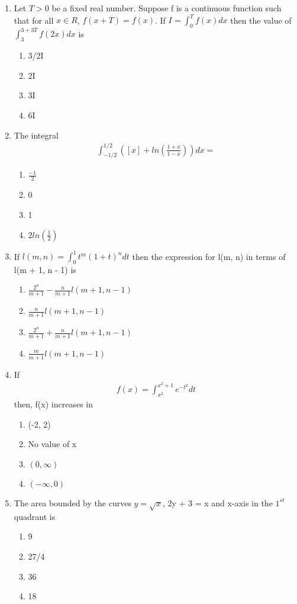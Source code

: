\begin{enumerate}[label=\arabic*.,ref=\thesubsection.\theenumi]
\item Let  $T > 0$ be a fixed real number. Suppose f is a continuous function such that for all $x \in R$, $f(x + T) = f(x)$. If $I = \int_{0}^{T}f(x)dx$ then the value of $\int_{3}^{3 + 3T}f(2x)dx$ is
\begin{enumerate}
\item 3/2I
\item 2I
\item 3I
\item 6I
\end{enumerate}

\item The integral
\begin{align*}
\int_{-1/2}^{1/2}([x] + ln(\frac{1 + x}{1 - x}))dx = 
\end{align*}
\begin{enumerate}
\item $\frac{-1}{2}$
\item 0
\item 1
\item $2ln(\frac{1}{2})$
\end{enumerate}

\item If 
$l(m, n) = \int_{0}^{1}t^{m}(1 + t)^{n}dt$
then the expression for l(m, n) in terms of l(m + 1, n - 1) is
\begin{enumerate}
\item $\frac{2^n}{m + 1} - \frac{n}{m + 1}l(m + 1, n -1)$
\item $\frac{n}{m + 1}l(m + 1, n -1)$
\item $\frac{2^n}{m + 1} + \frac{n}{m + 1}l(m + 1, n -1)$
\item $\frac{m}{m + 1}l(m + 1, n -1)$
\end{enumerate}

\item If 
\begin{align*}
f(x) = \int_{x^{2}}^{x^{2} + 1}e^{-t^{2}}dt
\end{align*}
then, f(x) increases in
\begin{enumerate}
\item (-2, 2)
\item No value of x
\item $(0, \infty)$
\item $(-\infty, 0)$
\end{enumerate}

\item The area bounded by the curves $y = \sqrt{x}$, 2y + 3 = x and x-axis in the $1^{st}$ quadrant is
\begin{enumerate}
\item 9
\item 27/4
\item 36
\item 18
\end{enumerate}


\end{enumerate}

